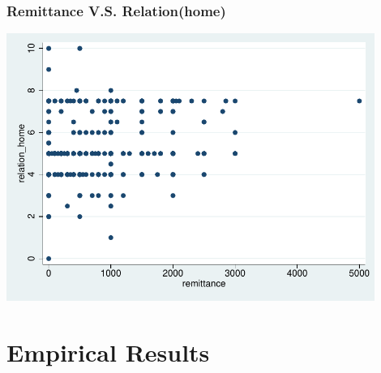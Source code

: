 \documentclass[10pt]{beamer}
\begin{document}
\begin{frame}[c]\frametitle{Remittance V.S. Relation(home)}
\begin{center}
\includegraphics[width=0.9\textwidth]{relation_home_remittance.pdf}
\end{center}
\end{frame}

\section{Empirical Results}
\end{document}

